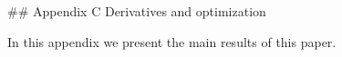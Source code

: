 

## Appendix C Derivatives and optimization

In this appendix we present the main results of this paper.


